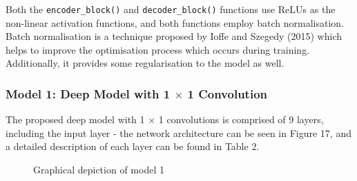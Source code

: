 \documentclass[a4paper]{article}
\begin{document}
Both the \verb|encoder_block()| and \verb|decoder_block()| functions use ReLUs as the non-linear activation functions, and both functions employ batch normalisation. Batch normalisation is a technique proposed by Ioffe and Szegedy (2015) which helps to improve the optimisation process which occurs during training. Additionally, it provides some regularisation to the model as well.

\clearpage

\subsubsection{Model 1: Deep Model with 1 $\times$ 1 Convolution}
The proposed deep model with 1 $\times$ 1 convolutions is comprised of 9 layers, including the input layer - the network architecture can be seen in Figure 17, and a detailed description of each layer can be found in Table 2.
\begin{figure}[h]
\centering
{}
\caption{Graphical depiction of model 1}
\end{figure}
\end{document}
